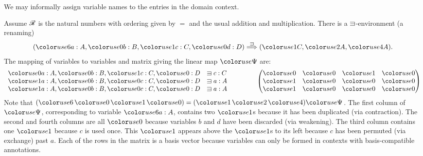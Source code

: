 
We may informally assign variable names to the entries in the domain
context.

\begin{example}
  Assume $\mathscr R$ is the natural numbers with ordering given by $=$ and the usual
  addition and multiplication.
  There is a $\sqni$-environment (a renaming)
  \[
    \plr{\gr6a : A, \gr0b : B, \gr1c : C, \gr0d : D} \env\sqni
    \plr{\gr1C, \gr2A, \gr4A}.
  \]
  The mapping of variables to variables and matrix giving the linear
  map $\gr\Psi$ are:
  \begin{displaymath}
    \begin{array}{ll}
    \gr0a : A, \gr0b : B, \gr1c : C, \gr0 : D &\sqni c : C \\
    \gr1a : A, \gr0b : B, \gr0c : C, \gr0 : D &\sqni a : A \\
    \gr1a : A, \gr0b : B, \gr0c : C, \gr0 : D &\sqni a : A
    \end{array}
    \qquad\qquad
    \begin{pmatrix}
      \gr0 & \gr0 & \gr1 & \gr0 \\
      \gr1 & \gr0 & \gr0 & \gr0 \\
      \gr1 & \gr0 & \gr0 & \gr0
    \end{pmatrix}
  \end{displaymath}
  Note that $(\gr 6\,\gr 0\,\gr 1\,\gr 0) = (\gr 1\,\gr 2\,\gr 4)\gr \Psi$.
  The first column of $\gr\Psi$, corresponding to variable $\gr6a : A$, contains two $\gr1$s
  because it has been duplicated (via contraction).
  The second and fourth columns are all $\gr0$ because variables
  $b$ and $d$ have been discarded (via weakening).
  The third column contains one $\gr1$ because $c$ is used once.
  This $\gr1$ appears above the $\gr1$s to its left because $c$ has been
  permuted (via exchange) past $a$.
  Each of the rows in the matrix is a basis vector because variables can only
  be formed in contexts with basis-compatible annotations.
\end{example}

